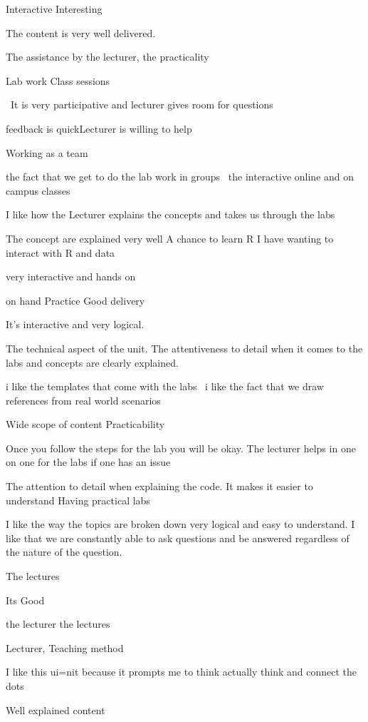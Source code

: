\documentclass[
]{article}
\begin{document}
\begin{enumerate}
\begin{itemize}
    Interactive Interesting~

    The content is very well delivered.

    The assistance by the lecturer, the practicality

    Lab work Class sessions

    ~It is very participative and lecturer gives room for questions

    feedback is quickLecturer is willing to help

    Working as a team

    the fact that we get to do the lab work in groups~ the interactive
    online and on campus classes

    I like how the Lecturer explains the concepts and takes us through
    the labs

    The concept are explained very well A chance to learn R I have
    wanting to interact with R and data

    very interactive and hands on

    on hand Practice Good delivery

    It's interactive and very logical.

    The technical aspect of the unit. The attentiveness to detail when
    it comes to the labs and concepts are clearly explained.

    i like the templates that come with the labs~ i like the fact that
    we draw references from real world scenarios~

    Wide scope of content Practicability

    Once you follow the steps for the lab you will be okay. The lecturer
    helps in one on one for the labs if one has an issue

    The attention to detail when explaining the code. It makes it easier
    to understand Having practical labs

    I like the way the topics are broken down very logical and easy to
    understand. I like that we are constantly able to ask questions and
    be answered regardless of the nature of the question.

    The lectures

    Its Good

    the lecturer the lectures

    Lecturer, Teaching method

    I like this ui=nit because it prompts me to think actually think and
    connect the dots~

    Well explained content


\end{itemize}
\end{enumerate}
\end{document}
